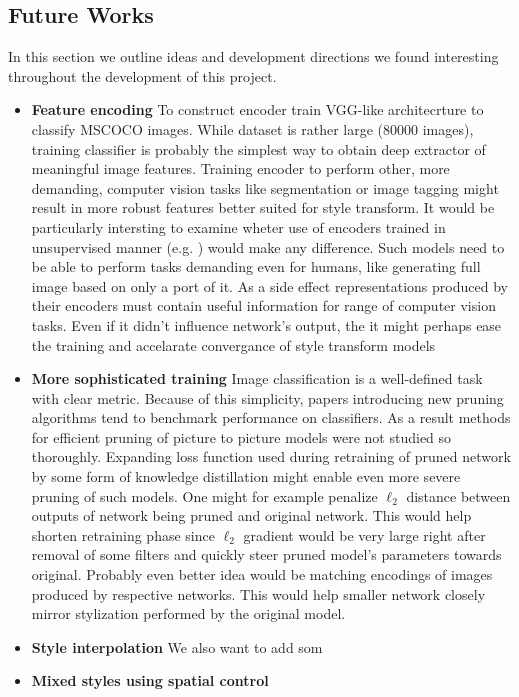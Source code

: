 \documentclass[../Main.tex]{subfiles}
\begin{document}
\subsection{Future Works}
In this section we outline ideas and development directions we found interesting
throughout the development of this project.
\begin{itemize}
\item \textbf{Feature encoding}
    To construct encoder \cite{Li2018} train VGG-like architecrture to classify 
    MSCOCO images. While dataset is rather large (80000 images), training classifier
    is probably the simplest way to obtain deep extractor of meaningful image features.
    Training encoder to perform other, more demanding, computer vision tasks like 
    segmentation or image tagging might result in more robust features better suited
    for style transform. It would be particularly intersting to examine wheter use of encoders
    trained in unsupervised manner (e.g. \cite{CPC, CPCv2}) would make any difference.
    Such models need to be able to perform tasks demanding even for humans, like generating
    full image based on only a port of it. As a side effect representations produced by their
    encoders must contain useful information for range of computer vision tasks.
    Even if it didn't influence network's output, the it might perhaps ease the training
    and accelarate convergance of style transform models
\item \textbf{More sophisticated training}
    Image classification is a well-defined task with clear metric.
    Because of this simplicity, papers introducing new pruning algorithms tend to 
    benchmark performance on classifiers. As a result methods for efficient pruning of
    picture to picture models were not studied so thoroughly. Expanding loss function used during
    retraining of pruned network by some form of knowledge distillation might enable
    even more severe pruning of such models. One might for example penalize $\ell_2$
    distance between outputs of network being pruned and original network.
    This would help shorten retraining phase since $\ell_2$ gradient
    would be very large right after removal of some filters and quickly steer pruned
    model's parameters towards original. Probably even better idea would be matching
    encodings of images produced by respective networks. This would help
    smaller network closely mirror stylization performed by the original model.
\item \textbf{Style interpolation}
    We also want to add som
\item \textbf{Mixed styles using spatial control}
    
    
\end{itemize}

\biblio %
\end{document}
